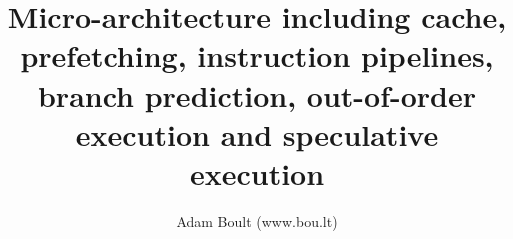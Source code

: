 \documentclass[oneside]{book}
\begin{document}
\author{Adam Boult (www.bou.lt)}
\title{Micro-architecture including cache, prefetching, instruction pipelines, branch prediction, out-of-order execution and speculative execution}
\maketitle

\setcounter{tocdepth}{0}
\tableofcontents


\end{document}
